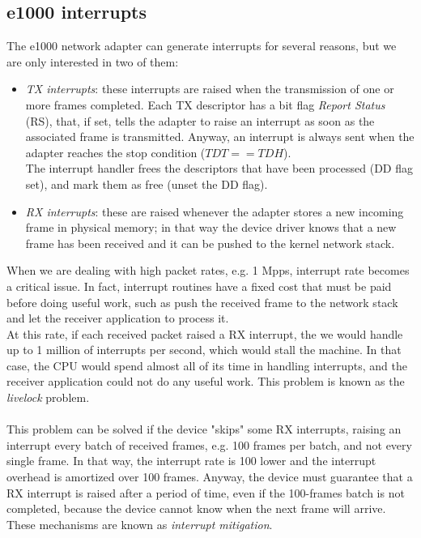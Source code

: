 \documentclass[a4paper, 12pt, titlepage]{report}
\begin{document}
\subsection{e1000 interrupts} \label{subsec:e1000_interrutps}
The e1000 network adapter can generate interrupts for several reasons, but we are only interested in two of them:
\begin{itemize}
\item \textit{TX interrupts}: these interrupts are raised when the transmission of one or more frames completed. Each TX descriptor has a bit flag \textit{Report Status} (RS), that, if set, tells the adapter to raise an interrupt as soon as the associated frame is transmitted. Anyway, an interrupt is always sent when the adapter reaches the stop condition ($TDT == TDH$).
\\
The interrupt handler frees the descriptors that have been processed (DD flag set), and mark them as free (unset the DD flag).
\item \textit{RX interrupts}: these are raised whenever the adapter stores a new incoming frame in physical memory; in that way the device driver knows that a new frame has been received and it can be pushed to the kernel network stack.
\end{itemize}
When we are dealing with high packet rates, e.g. 1 Mpps, interrupt rate becomes a critical issue. In fact, interrupt routines have a fixed cost that must be paid before doing useful work, such as push the received frame to the network stack and let the receiver application to process it.
\\
At this rate, if each received packet raised a RX interrupt, the we would handle up to 1 million of interrupts per second, which would stall the machine. In that case, the CPU would spend almost all of its time in handling interrupts, and the receiver application could not do any useful work. This problem is known as the \textit{livelock} problem.
\\
\\
This problem can be solved if the device "skips" some RX interrupts, raising an interrupt every batch of received frames, e.g. 100 frames per batch, and not every single frame. In that way, the interrupt rate is 100 lower and the interrupt overhead is amortized over 100 frames. Anyway, the device must guarantee that a RX interrupt is raised after a period of time, even if the 100-frames batch is not completed, because the device cannot know when the next frame will arrive.
\\
These mechanisms are known as \textit{interrupt mitigation}. 
\end{document}
